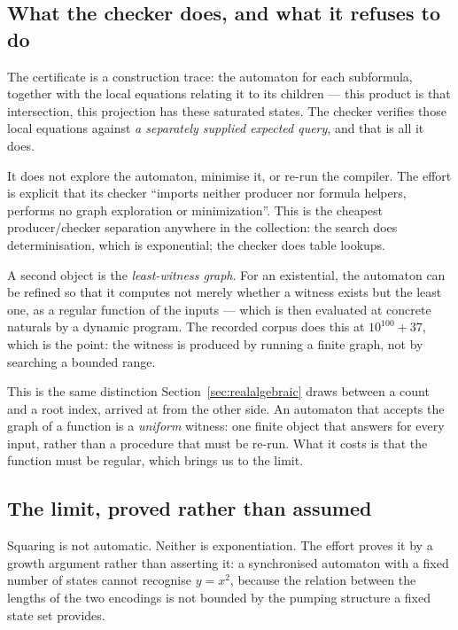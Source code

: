 \subsection{What the checker does, and what it refuses to do}

The certificate is a construction trace: the automaton for each subformula,
together with the local equations relating it to its children --- this product
is that intersection, this projection has these saturated states. The checker
verifies those local equations against \emph{a separately supplied expected
query}, and that is all it does.

It does not explore the automaton, minimise it, or re-run the compiler. The
effort is explicit that its checker ``imports neither producer nor formula
helpers, performs no graph exploration or minimization''. This is the cheapest
producer/checker separation anywhere in the collection: the search does
determinisation, which is exponential; the checker does table lookups.

A second object is the \emph{least-witness graph}. For an existential, the
automaton can be refined so that it computes not merely whether a witness
exists but the least one, as a regular function of the inputs --- which is then
evaluated at concrete naturals by a dynamic program. The recorded corpus does
this at $10^{100}+37$, which is the point: the witness is produced by running a
finite graph, not by searching a bounded range.

\begin{remark}
This is the same distinction Section~\ref{sec:realalgebraic} draws between a
count and a root index, arrived at from the other side. An automaton that
accepts the graph of a function is a \emph{uniform} witness: one finite object
that answers for every input, rather than a procedure that must be re-run. What
it costs is that the function must be regular, which brings us to the limit.
\end{remark}

\subsection{The limit, proved rather than assumed}

Squaring is not automatic. Neither is exponentiation. The effort proves it by a
growth argument rather than asserting it: a synchronised automaton with a fixed
number of states cannot recognise $y=x^2$, because the relation between the
lengths of the two encodings is not bounded by the pumping structure a fixed
state set provides.

